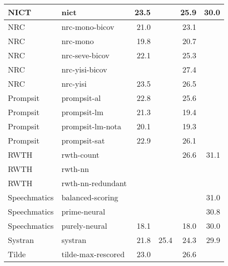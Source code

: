 \begin{table*}
\begin{center}
\begin{tabular}{|l|l|r|r|r|r|}
NICT & nict & 23.5 & \cellcolor{lightyellow}{26.0} & 25.9 & 30.0 \\ \hline
NRC & nrc-mono-bicov & 21.0 & \cellcolor{lightgreen}{26.2} & 23.1 & \cellcolor{lightyellow}{31.6} \\ \hline
NRC & nrc-mono & 19.8 & \cellcolor{lightyellow}{26.0} & 20.7 & \cellcolor{lightyellow}{31.2} \\ \hline
NRC & nrc-seve-bicov & 22.1 & \cellcolor{lightgreen}{26.2} & 25.3 & \cellcolor{lightgreen}{31.7} \\ \hline
NRC & nrc-yisi-bicov & \cellcolor{lightyellow}{23.9} & \cellcolor{lightgreen}{26.4} & 27.4 & \cellcolor{lightgreen}{31.9} \\ \hline
NRC & nrc-yisi & 23.5 & \cellcolor{lightgreen}{26.4} & 26.5 & \cellcolor{lightgreen}{31.8} \\ \hline
Prompsit & prompsit-al & 22.8 & \cellcolor{lightgreen}{26.4} & 25.6 & \cellcolor{lightgreen}{31.7} \\ \hline
Prompsit & prompsit-lm & 21.3 & \cellcolor{lightgreen}{26.3} & 19.4 & \cellcolor{lightgreen}{31.8} \\ \hline
Prompsit & prompsit-lm-nota & 20.1 & \cellcolor{lightgreen}{26.2} & 19.3 & \cellcolor{lightgreen}{31.7} \\ \hline
Prompsit & prompsit-sat & 22.9 & \cellcolor{lightgreen}{26.3} & 26.1 & \cellcolor{lightgreen}{31.7} \\ \hline
RWTH & rwth-count & \cellcolor{lightyellow}{23.9} & \cellcolor{lightyellow}{25.9} & 26.6 & 31.1 \\ \hline
RWTH & rwth-nn & \cellcolor{lightgreen}{24.5} & \cellcolor{lightgreen}{26.2} & \cellcolor{lightyellow}{28.0} & \cellcolor{lightyellow}{31.2} \\ \hline
RWTH & rwth-nn-redundant & \cellcolor{green}{24.6} & \cellcolor{lightgreen}{26.2} & \cellcolor{lightyellow}{28.0} & \cellcolor{lightyellow}{31.3} \\ \hline
Speechmatics & balanced-scoring & \cellcolor{lightyellow}{23.8} & \cellcolor{lightyellow}{25.8} & \cellcolor{lightyellow}{27.9} & 31.0 \\ \hline
Speechmatics & prime-neural & \cellcolor{lightyellow}{23.9} & \cellcolor{lightyellow}{25.9} & \cellcolor{lightyellow}{28.0} & 30.8 \\ \hline
Speechmatics & purely-neural & 18.1 & \cellcolor{lightyellow}{25.8} & 18.0 & 30.0 \\ \hline
Systran & systran & 21.8 & 25.4 & 24.3 & 29.9 \\ \hline
Tilde & tilde-max-rescored & 23.0 & \cellcolor{lightyellow}{26.0} & 26.6 & \cellcolor{lightyellow}{31.2} \\ \hline

\end{tabular}
\end{center}
\end{table*}

